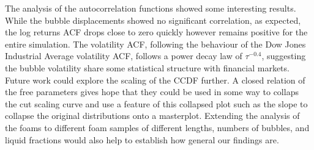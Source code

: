 The analysis of the autocorrelation functions showed some interesting results. While the bubble displacements showed no significant correlation, as expected, the log returns ACF drops close to zero quickly however remains positive for the entire simulation. The volatility ACF, following the behaviour of the Dow Jones Industrial Average volatility ACF, follows a power decay law of $\tau^{-0.4}$, suggesting the bubble volatility share some statistical structure with financial markets.\\

Future work could explore the scaling of the CCDF further. A closed relation of the free parameters gives hope that they could be used in some way to collaps the cut scaling curve and use a feature of this collapsed plot such as the slope to collapse the original distributions onto a masterplot. Extending the analysis of the foams to different foam samples of different lengths, numbers of bubbles, and liquid fractions would also help to establish how general our findings are.